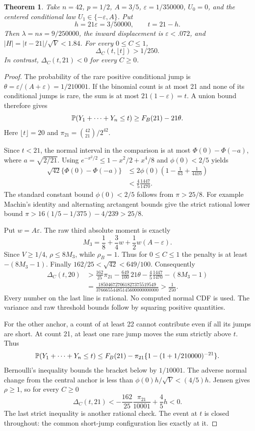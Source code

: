 \documentclass[11pt,a4paper]{article}
\newtheorem{theorem}{Theorem}\newtheorem{lemma}[theorem]{Lemma}
\begin{document}
\begin{theorem}\label{thm:counter}
Take $n=42$, $p=1/2$, $A=3/5$, $\varepsilon=1/350000$, $U_0=0$,
and the centered conditional law $U_1\in\{-\varepsilon,A\}$.
Put
\[
 h=21\varepsilon=3/50000,\qquad t=21-h.
\]
Then $\lambda=ns=9/250000$, the inward displacement is
$\varepsilon<.072$, and $|H|=|t-21|/\sqrt V<1.84$.
For every $0\le C\le1$,
\[
             \Delta_C(t,\lfloor t\rfloor)>1/250.
\]
In contrast, $\Delta_C(t,21)<0$ for every $C\ge0$.
\end{theorem}
\begin{proof}
The probability of the rare positive conditional jump is
$\theta=\varepsilon/(A+\varepsilon)=1/210001$.
If the binomial count is at most 21 and none of its conditional jumps is
rare, the sum is at most $21(1-\varepsilon)=t$. A union bound therefore gives
\[
 \mathbb P(Y_1+\cdots+Y_n\le t)\ge F_B(21)-21\theta.
\]
Here $\lfloor t\rfloor=20$ and
$\pi_{21}=\binom{42}{21}/2^{42}$.

Since $t<21$, the normal interval in the comparison is at most
$\Phi(0)-\Phi(-a)$, where $a=\sqrt{2/21}$.
Using $e^{-x^2/2}\le1-x^2/2+x^4/8$ and $\phi(0)<2/5$ yields
\begin{align*}
 \sqrt{42}\{\Phi(0)-\Phi(-a)\}
 &\le 2\phi(0)\left(1-\frac1{63}+\frac1{4410}\right)\\
 &<\frac45\frac{1447}{1470}.
\end{align*}
The standard constant bound $\phi(0)<2/5$ follows from $\pi>25/8$.
For example Machin's identity and alternating arctangent bounds give the
strict rational lower bound
$\pi>16(1/5-1/375)-4/239>25/8$.

Put $w=A\varepsilon$. The raw third absolute moment is exactly
\[
 M_3=\frac18+\frac34w+\frac12w(A-\varepsilon).
\]
Since $V\ge1/4$, $\rho\le8M_3$, while $\rho_B=1$.
Thus for $0\le C\le1$ the penalty is at least $-(8M_3-1)$.
Finally $162/25<\sqrt{42}<649/100$. Consequently
\begin{align*}
 \Delta_C(t,20)
 &>\frac{162}{25}\pi_{21}-\frac{649}{100}\,21\theta
    -\frac45\frac{1447}{1470}-(8M_3-1)\\
 &=\frac{185046727061827375519549}{37666554485145600000000000}
 >\frac1{250}.
\end{align*}
Every number on the last line is rational. No computed normal CDF is used.
The variance and raw threshold bounds follow by squaring positive quantities.

For the other anchor, a count of at least 22 cannot contribute even if all
its jumps are short. At count 21, at least one rare jump moves the sum strictly
above $t$. Thus
\[
 \mathbb P(Y_1+\cdots+Y_n\le t)
 \le F_B(21)-\pi_{21}\{1-(1+1/210000)^{-21}\}.
\]
Bernoulli's inequality bounds the bracket below by $1/10001$.
The adverse normal change from the central anchor is less than
$\phi(0)h/\sqrt V<(4/5)h$. Jensen gives $\rho\ge1$, so for every $C\ge0$
\[
 \Delta_C(t,21)<-\frac{162}{25}\frac{\pi_{21}}{10001}+\frac45h<0.
\]
The last strict inequality is another rational check. The event at $t$ is
closed throughout: the common short-jump configuration lies exactly at it.
\end{proof}
\end{document}
